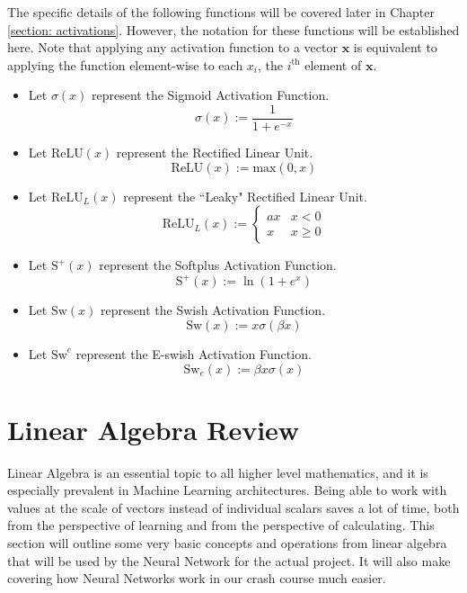 \documentclass[12pt]{report}
\begin{document}
The specific details of the following functions will be covered later in Chapter \ref{section: activations}. However, the notation for these functions will be established here. Note that applying any activation function to a vector $\textbf{x}$ is equivalent to applying the function element-wise to each $x_i$, the $i^{\text{th}}$ element of $\textbf{x}$.
\begin{itemize}
    \item Let $\sigma(x)$ represent the Sigmoid Activation Function.
    $$\sigma(x) := \frac{1}{1+e^{-x}}$$
    
    \item Let $\text{ReLU}(x)$ represent the Rectified Linear Unit.
    $$\text{ReLU}(x) := \text{max}(0,x)$$
    
    \item Let $\text{ReLU}_L(x)$ represent the ``Leaky" Rectified Linear Unit.
    $$\text{ReLU}_L(x) :=
    \begin{cases} 
    ax & x < 0 \\
    x & x \geq 0
   \end{cases}$$
   
   \item Let $\text{S}^+(x)$ represent the Softplus Activation Function.
   $$\text{S}^+(x) := \ln(1 + e^x)$$
   
   \item Let $\text{Sw}(x)$ represent the Swish Activation Function.
   $$\text{Sw}(x) := x \sigma(\beta x)$$
   
   \item Let $\text{Sw}^e$ represent the E-swish Activation Function.
   $$\text{Sw}_e(x) := \beta x \sigma(x)$$
   
\end{itemize}

\section{Linear Algebra Review}
Linear Algebra is an essential topic to all higher level mathematics, and it is especially prevalent in Machine Learning architectures. Being able to work with values at the scale of vectors instead of individual scalars saves a lot of time, both from the perspective of learning and from the perspective of calculating. This section will outline some very basic concepts and operations from linear algebra that will be used by the Neural Network for the actual project. It will also make covering how Neural Networks work in our crash course much easier.
\end{document}
